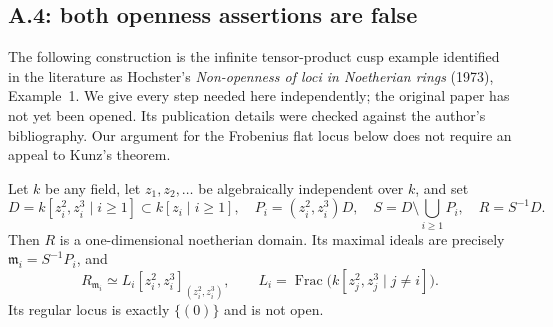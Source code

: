 \subsection{A.4: both openness assertions are false}

The following construction is the infinite tensor-product cusp example
identified in the literature as Hochster's
\emph{Non-openness of loci in Noetherian rings} (1973), Example~1.
We give every step needed here independently; the original paper has not
yet been opened.  Its publication details were checked against the
author's bibliography.  Our argument for the Frobenius flat locus below
does not require an appeal to Kunz's theorem.

\begin{lemma}\label{SA23-A-10}
Let $k$ be any field, let $z_1,z_2,\ldots$ be algebraically independent
over $k$, and set
\[
 D=k[z_i^2,z_i^3\mid i\geq1]\subset k[z_i\mid i\geq1],\quad
 P_i=(z_i^2,z_i^3)D,\quad
 S=D\setminus\bigcup_{i\geq1}P_i,\quad R=S^{-1}D.
\]
Then $R$ is a one-dimensional noetherian domain.  Its maximal ideals
are precisely $\mathfrak m_i=S^{-1}P_i$, and
\[
 R_{\mathfrak m_i}\simeq
 L_i[z_i^2,z_i^3]_{(z_i^2,z_i^3)},\qquad
 L_i=\operatorname{Frac}\bigl(k[z_j^2,z_j^3\mid j\ne i]\bigr).
\]
Its regular locus is exactly $\{(0)\}$ and is not open.
\end{lemma}
